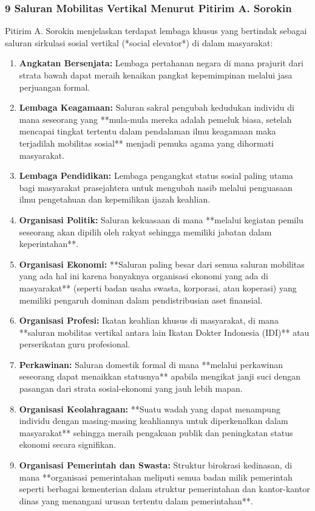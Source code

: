 \documentclass[12pt, a4paper]{article}
\begin{document}
\subsubsection{9 Saluran Mobilitas Vertikal Menurut Pitirim A. Sorokin}
Pitirim A. Sorokin menjelaskan terdapat lembaga khusus yang bertindak sebagai saluran sirkulasi sosial vertikal (*social elevator*) di dalam masyarakat:
\begin{enumerate}
    \item \textbf{Angkatan Bersenjata:} Lembaga pertahanan negara di mana prajurit dari strata bawah dapat meraih kenaikan pangkat kepemimpinan melalui jasa perjuangan formal.
    \item \textbf{Lembaga Keagamaan:} Saluran sakral pengubah kedudukan individu di mana seseorang yang **mula-mula mereka adalah pemeluk biasa, setelah mencapai tingkat tertentu dalam pendalaman ilmu keagamaan maka terjadilah mobilitas sosial** menjadi pemuka agama yang dihormati masyarakat.
    \item \textbf{Lembaga Pendidikan:} Lembaga pengangkat status sosial paling utama bagi masyarakat prasejahtera untuk mengubah nasib melalui penguasaan ilmu pengetahuan dan kepemilikan ijazah keahlian.
    \item \textbf{Organisasi Politik:} Saluran kekuasaan di mana **melalui kegiatan pemilu seseorang akan dipilih oleh rakyat sehingga memiliki jabatan dalam keperintahan**.
    \item \textbf{Organisasi Ekonomi:} **Saluran paling besar dari semua saluran mobilitas yang ada hal ini karena banyaknya organisasi ekonomi yang ada di masyarakat** (seperti badan usaha swasta, korporasi, atau koperasi) yang memiliki pengaruh dominan dalam pendistribusian aset finansial.
    \item \textbf{Organisasi Profesi:} Ikatan keahlian khusus di masyarakat, di mana **saluran mobilitas vertikal antara lain Ikatan Dokter Indonesia (IDI)** atau perserikatan guru profesional.
    \item \textbf{Perkawinan:} Saluran domestik formal di mana **melalui perkawinan seseorang dapat menaikkan statusnya** apabila mengikat janji suci dengan pasangan dari strata sosial-ekonomi yang jauh lebih mapan.
    \item \textbf{Organisasi Keolahragaan:} **Suatu wadah yang dapat menampung individu dengan masing-masing keahliannya untuk diperkenalkan dalam masyarakat** sehingga meraih pengakuan publik dan peningkatan status ekonomi secara signifikan.
    \item \textbf{Organisasi Pemerintah dan Swasta:} Struktur birokrasi kedinasan, di mana **organisasi pemerintahan meliputi semua badan milik pemerintah seperti berbagai kementerian dalam struktur pemerintahan dan kantor-kantor dinas yang menangani urusan tertentu dalam pemerintahan**.
\end{enumerate}
\end{document}
